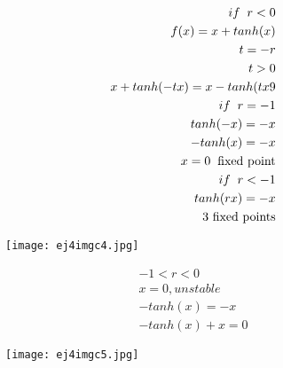 \documentclass[a4paper,10pt]{article}
\begin{document}
\begin{enumerate}
\begin{enumerate}
                \begin{equation}
                    \begin{aligned}
                        if \hspace{0.2cm}r< 0\\
                        f(x)= x+ tanh(x)\\
                        t=-r\\
                        t>0\\
                        x+ tanh(-tx)= x-tanh(tx9\\
                        if \hspace{0.2cm}r= -1\\
                        tanh(-x)=-x\\
                        -tanh(x)= -x\\
                        x=0 \hspace{0.2cm}\text{fixed point}\\
                        if \hspace{0.2cm}r<-1\\
                        tanh(rx)= -x\\
                        \text{ 3 fixed points}
                    \end{aligned}
                \end{equation}
                \newpage
                \begin{figure}[h]
                    \centering
                    \texttt{[image: ej4imgc4.jpg]}
                    \label{fig:mesh1}
                \end{figure} 
                \begin{equation}
                    \begin{aligned}
                        -1<r<0\\
                        x=0, unstable\\
                        -tanh(x)= -x\\
                        -tanh(x)+x=0
                    \end{aligned}
                \end{equation}
                \newpage
                \begin{figure}[h]
                    \centering
                    \texttt{[image: ej4imgc5.jpg]}
                    \label{fig:mesh1}
                \end{figure}

\end{enumerate}
\end{enumerate}
\end{document}
